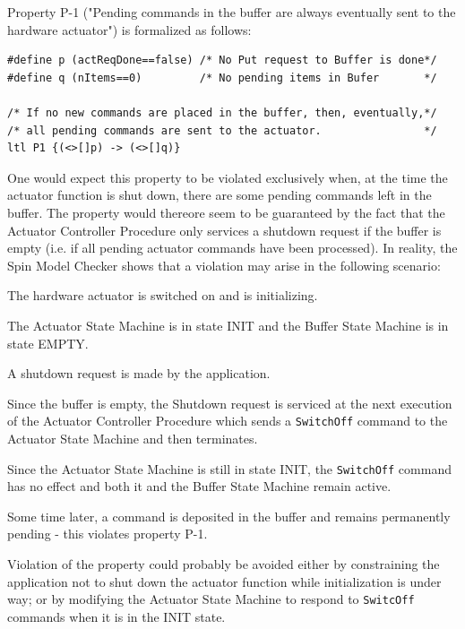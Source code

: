 \documentclass[a4paper,10pt]{article}
\newenvironment{fw_itemize}						%
{\begin{itemize}
  \setlength{\itemsep}{1mm}
  \setlength{\parskip}{0pt}
  \setlength{\parsep}{0pt}}
{\end{itemize}}
\begin{document}
Property P-1 ("Pending commands in the buffer are always eventually sent to the hardware actuator") is formalized as follows:

\captionsetup[lstlisting]{labelformat=empty,labelsep=none}

\begin{lstlisting}
#define p (actReqDone==false) /* No Put request to Buffer is done*/
#define q (nItems==0)         /* No pending items in Bufer       */

/* If no new commands are placed in the buffer, then, eventually,*/
/* all pending commands are sent to the actuator.                */
ltl P1 {(<>[]p) -> (<>[]q)}
\end{lstlisting}

One would expect this property to be violated exclusively when, at the time the actuator function is shut down, there are some pending commands left in the buffer. The property would thereore seem to be guaranteed by the fact that the Actuator Controller Procedure only services a shutdown request if the buffer is empty (i.e. if all pending  actuator commands have been processed). In reality, the Spin Model Checker shows that a violation may arise in the following scenario:

\begin{fw_itemize}
\item The hardware actuator is switched on and is initializing.
\item The Actuator State Machine is in state INIT and the Buffer State Machine is in state EMPTY.
\item A shutdown request is made by the application. 
\item Since the buffer is empty, the Shutdown request is serviced at the next execution of the Actuator Controller Procedure which sends a \texttt{SwitchOff} command to the Actuator State Machine and then terminates.
\item Since the Actuator State Machine is still in state INIT, the \texttt{SwitchOff} command has no effect and both it and the Buffer State Machine remain active.
\item Some time later, a command is deposited in the buffer and remains permanently pending - this violates property P-1.
\end{fw_itemize}

Violation of the property could probably be avoided either by constraining the application not to shut down the actuator function while initialization is under way; or by modifying the Actuator State Machine to respond to \texttt{SwitcOff} commands when it is in the INIT state.
\end{document}
